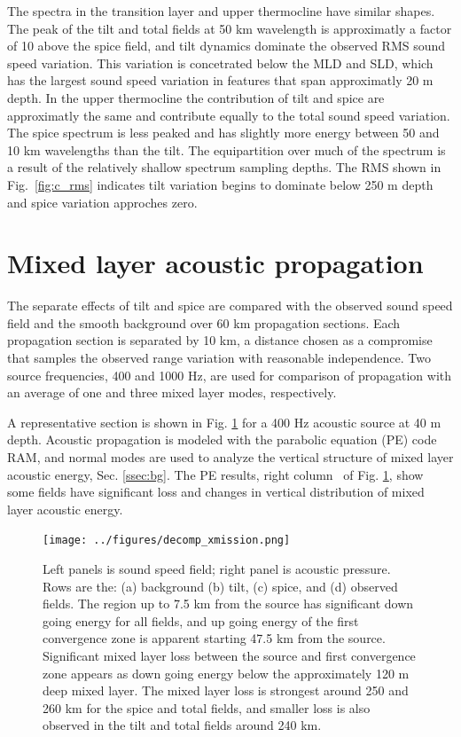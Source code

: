 \documentclass[preprint,NumberedRefs]{JASA}
\begin{document}
The spectra in the transition layer and upper thermocline have similar shapes. The peak of the tilt and total fields at 50 km wavelength is approximatly a factor of 10 above the spice field, and tilt dynamics dominate the observed RMS sound speed variation. This variation is concetrated below the MLD and SLD, which has the largest sound speed variation in features that span approximatly 20 m depth. In the upper thermocline the contribution of tilt and spice are approximatly the same and contribute equally to the total sound speed variation. The spice spectrum is less peaked and has slightly more energy between 50 and 10 km wavelengths than the tilt. The equipartition over much of the spectrum is a result of the relatively shallow spectrum sampling depths. The RMS shown in Fig.~\ref{fig:c_rms} indicates tilt variation begins to dominate below 250 m depth and spice variation approches zero.

\section{\label{sec:propagation}Mixed layer acoustic propagation}
The separate effects of tilt and spice are compared with the observed sound speed field and the smooth background over 60 km propagation sections. Each propagation section is separated by 10 km, a distance chosen as a compromise that samples the observed range variation with reasonable independence. Two source frequencies, 400 and 1000 Hz, are used for comparison of propagation with an average of one and three mixed layer modes, respectively.

A representative section is shown in Fig. \ref{fig:decomp_x} for a 400 Hz acoustic source at 40 m depth. Acoustic propagation is modeled with the parabolic equation (PE) code RAM\citep{collins93}, and normal modes are used to analyze the vertical structure of mixed layer acoustic energy, Sec. \ref{ssec:bg}. The PE results, right column  of Fig. \ref{fig:decomp_x}, show some fields have significant loss and changes in vertical distribution of mixed layer acoustic energy.

\begin{figure}
\texttt{[image: ../figures/decomp\_xmission.png]}
    \caption{\label{fig:decomp_x}{Left panels is sound speed field; right panel is acoustic pressure. Rows are the: (a) background (b) tilt, (c) spice, and (d) observed fields. The region up to 7.5 km from the source has significant down going energy for all fields, and up going energy of the first convergence zone is apparent starting 47.5 km from the source. Significant mixed layer loss between the source and first convergence zone appears as down going energy below the approximately 120 m deep mixed layer. The mixed layer loss is strongest around 250 and 260 km for the spice and total fields, and smaller loss is also observed in the tilt and total fields around 240 km.}}
\end{figure}
\end{document}
